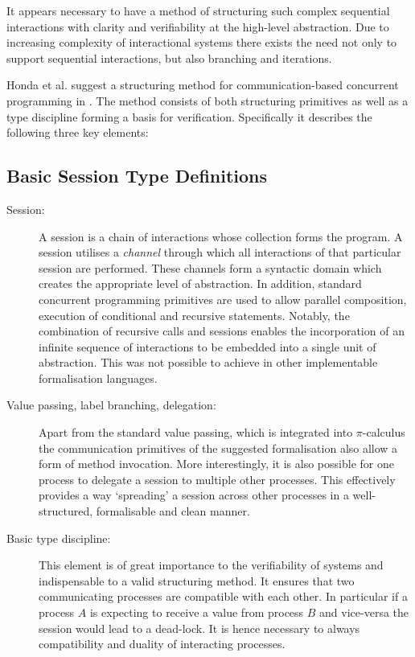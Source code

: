 It appears necessary to have a method of structuring such complex sequential interactions with clarity and verifiability at the high-level abstraction. Due to increasing complexity of interactional systems there exists the need not only to support sequential interactions, but also branching and iterations.

Honda et al. suggest a structuring method for communication-based concurrent programming in \cite{language_primitives}. The method consists of both structuring primitives as well as a type discipline forming a basis for verification. Specifically it describes the following three key elements:

\subsection{Basic Session Type Definitions}
\begin{description}
  \item[Session:] A session is a chain of interactions whose collection forms the program. A session utilises a \textit{channel} through which all interactions of that particular session are performed. These channels form a syntactic domain which creates the appropriate level of abstraction. In addition, standard concurrent programming primitives are used to allow parallel composition, execution of conditional and recursive statements. Notably, the combination of recursive calls and sessions enables the incorporation of an infinite sequence of interactions to be embedded into a single unit of abstraction. This was not possible to achieve in other implementable formalisation languages.
  \item[Value passing, label branching, delegation:] Apart from the standard value passing, which is integrated into $\pi$-calculus the communication primitives of the suggested formalisation also allow a form of method invocation. More interestingly, it is also possible for one process to delegate a session to multiple other processes. This effectively provides a way `spreading' a session across other processes in a well-structured, formalisable and clean manner.
  \item[Basic type discipline:] This element is of great importance to the verifiability of systems and indispensable to a valid structuring method. It ensures that two communicating processes are compatible with each other. In particular if a process $A$ is expecting to receive a value from process $B$ and vice-versa the session would lead to a dead-lock. It is hence necessary to always compatibility and duality of interacting processes.
\end{description}

